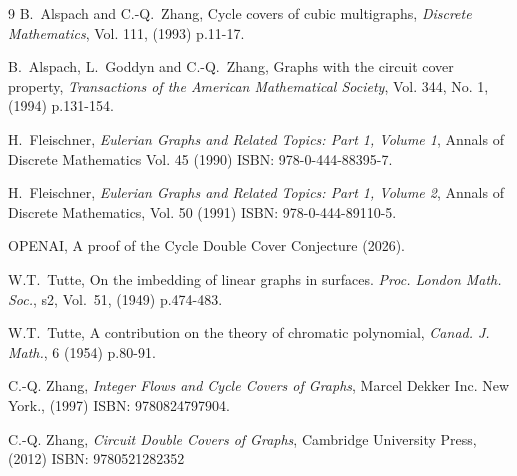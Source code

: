 \documentclass[11pt]{article}
\begin{document}
      \begin{thebibliography}{9}
       B.~Alspach and C.-Q.~Zhang, Cycle covers of cubic multigraphs, {\it Discrete Mathematics}, Vol. 111, (1993) p.11-17.

           B.~Alspach, L.~Goddyn and C.-Q.~Zhang, Graphs with the circuit cover property, {\it Transactions of the American Mathematical Society}, Vol. 344, No. 1, (1994) p.131-154.

               H.~Fleischner, {\it Eulerian Graphs and Related Topics: Part 1, Volume 1}, Annals of Discrete Mathematics Vol. 45 (1990) ISBN: 978-0-444-88395-7.

 H.~Fleischner, {\it Eulerian Graphs and Related Topics: Part 1, Volume 2}, Annals of Discrete Mathematics, Vol. 50 (1991) ISBN: 978-0-444-89110-5.

 OPENAI, A proof of the Cycle Double Cover Conjecture (2026).

 W.T.~Tutte, On the imbedding of linear graphs in surfaces. {\it Proc. London Math. Soc.}, s2, Vol.~51, (1949) p.474-483.

 W.T.~Tutte, A contribution on the theory of chromatic polynomial,
{\it Canad. J. Math.}, 6 (1954) p.80-91.

      C.-Q. Zhang, {\it Integer Flows and Cycle Covers of Graphs}, Marcel Dekker Inc. New York., (1997) ISBN: 9780824797904.

 C.-Q. Zhang, {\it Circuit Double Covers of Graphs}, Cambridge University Press, (2012)
ISBN:
9780521282352

    \end{thebibliography}
     
\end{document}
